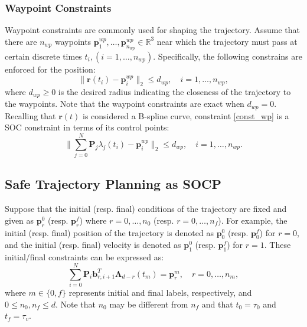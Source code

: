 \documentclass[journal,10pt]{IEEEtran}
\newcommand{\vect}[1]{\boldsymbol{\mathbf{#1}}}
\begin{document}
\subsubsection{Waypoint Constraints}
Waypoint constraints are commonly used for shaping the trajectory.  %
Assume that there are $n_{wp}$ waypoints $\vect{p}_1^{wp},\ldots,\vect{p}_{n_{wp}}^{wp}\in\mathbb{R}^3$ near which the trajectory must pass at certain discrete times $t_i, (i=1,\ldots,n_{wp})$. Specifically, the following constrains are enforced for the position:
\begin{equation}
    \|\vect{r}(t_i)-\vect{p}^{wp}_i\|_2\leq d_{wp}, \quad i=1,\dots,n_{wp}
    \label{const_wp},
\end{equation}
where $d_{wp}\geq 0$ is the desired radius indicating the closeness of the trajectory to the waypoints. Note that the waypoint constraints are exact when $d_{wp}=0$. Recalling that $\vect{r}(t)$ is considered a B-spline curve, constraint \eqref{const_wp} is a SOC constraint in terms of its control points:
\begin{equation}\label{cp_wp}
    \bigg\|\sum_{j=0}^{N}\vect{P}_j\lambda_{j}(t_i) - \vect{p}_{i}^{wp}\bigg\|_2\leq d_{wp}, \quad i = 1,\dots,n_{wp}.
\end{equation}

\subsection{Safe Trajectory Planning as SOCP}

Suppose that the initial (resp. final) conditions of the trajectory are fixed and given as $\vect{p}^{0}_r$ (resp. $\vect{p}^{f}_r$) where $r = 0,\dots,n_0$ (resp. $r=0,\dots,n_f$). For example, the initial (resp. final) position of the trajectory is denoted as $\vect{p}_0^0$ (resp. $\vect{p}_0^f$) for $r=0$, and the initial (resp. final) velocity is denoted as $\vect{p}^{0}_1$ (resp. $\vect{p}^{f}_1$) for $r=1$. 
These initial/final constraints can be expressed as:
\begin{equation}\label{extremes}
    \sum_{i=0}^N\vect{P}_i\vect{b}_{r,i+1}^T\vect{\Lambda}_{d-r}(t_m) = \vect{p}^m_{r}, \quad r = 0,\dots,n_m,
\end{equation}
where $m\in\{0,f\}$ represents initial and final labels, respectively, and $0\leq n_0,n_f\leq d$. Note that $n_0$ may be different from $n_f$ and that $t_0 = \tau_0$ and $t_f = \tau_v$. 
\end{document}
